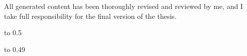 All generated content has been thoroughly revised and reviewed by me, and I take full responsibility for the final version of the thesis.
\newpage


\openright

\noindent
\Dedication

\newpage


\openright
{\InfoPageFont

\vtop to 0.5


\ifx\StudyLanguage\LangCS

    \vtop to 0.49

\fi

}

\newpage

\pagestyle{plain}
